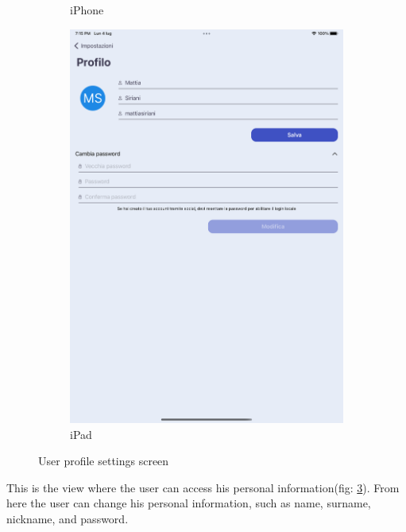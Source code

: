 \begin{figure}[h!]
\begin{subfigure}[b]{0.3\textwidth}
            \caption{iPhone}
            \label{fig:user_profile_settings_screen_iphone}
        \end{subfigure}
        \begin{subfigure}[b]{0.45\textwidth}
            \centering
            \includegraphics[width=\textwidth]{images/interfaces/user_profile_settings_screen_ipad.png}
            \caption{iPad}
            \label{fig:user_profile_settings_screen_ipad}
        \end{subfigure}
         \caption{User profile settings screen}
        \label{fig:user_profile_settings_screen}
\end{figure}
\FloatBarrier
This is the view where the user can access his personal information(fig: \ref{fig:user_profile_settings_screen}). From here the user can change his personal information, such as name, surname, nickname, and password.\\\\

